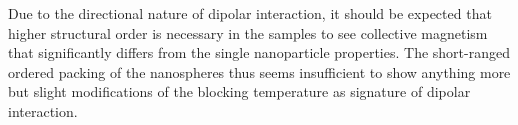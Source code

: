 \documentclass[\main/dresen_thesis.tex]{subfiles}
\begin{document}
  Due to the directional nature of dipolar interaction, it should be expected that higher structural order is necessary in the samples to see collective magnetism that significantly differs from the single nanoparticle properties.
  The short-ranged ordered packing of the nanospheres thus seems insufficient to show anything more but slight modifications of the blocking temperature as signature of dipolar interaction.
\end{document}
